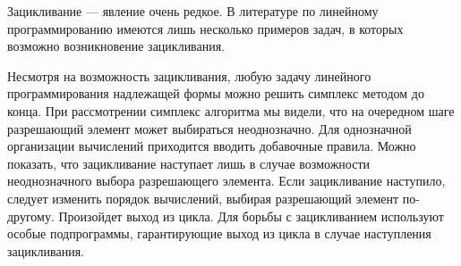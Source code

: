 \documentclass{article}
\begin{document}
Зацикливание — явление очень редкое. В литературе по линейному программированию имеются лишь несколько примеров задач, в которых возможно возникновение зацикливания.

Несмотря на возможность зацикливания, любую задачу линейного программирования надлежащей формы можно решить симплекс методом до конца. При рассмотрении симплекс алгоритма мы видели, что на очередном шаге разрешающий элемент может  выбираться неоднозначно. Для однозначной организации вычислений приходится вводить добавочные правила. Можно показать, что зацикливание наступает лишь в случае возможности неоднозначного выбора разрешающего элемента. Если зацикливание наступило, следует изменить порядок вычислений, выбирая разрешающий элемент по-другому. Произойдет выход из цикла. Для борьбы с зацикливанием используют особые подпрограммы, гарантирующие выход из цикла в случае наступления зацикливания.
\end{document}
